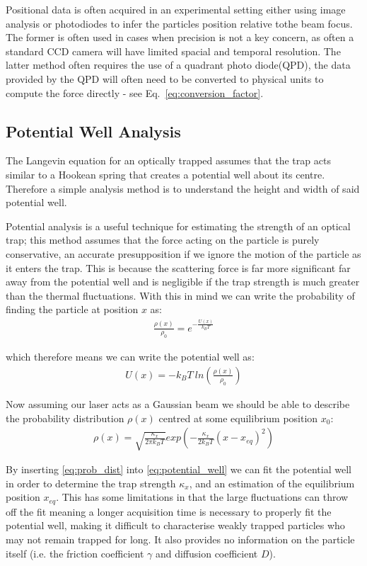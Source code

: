 Positional data is often acquired in an experimental setting 
either using image analysis or photodiodes to infer the particles 
position relative tothe beam focus. The former is often used in 
cases when precision is not a key concern, as often a standard 
CCD camera will have limited spacial and temporal resolution. 
The latter method often requires the use of a quadrant photo 
diode(QPD), the data provided by the QPD will often need to be 
converted to physical units to compute the force directly - see Eq.~\eqref{eq:conversion_factor}.

\subsection{Potential Well Analysis}
The Langevin equation for an optically trapped assumes that the 
trap acts similar to a Hookean spring that creates a potential 
well about its centre. Therefore a simple analysis method is to 
understand the height and width of said potential well. 

Potential analysis is a useful technique for estimating the 
strength of an optical trap; this method assumes that the force 
acting on the particle is purely conservative, an accurate 
presupposition if we ignore the motion of the particle as it 
enters the trap. This is because the scattering force is far 
more significant far away from the potential well and is 
negligible if the trap strength is much greater than the thermal 
fluctuations. With this in mind we can write the probability of 
finding the particle at position $x$ as:
\begin{align}
	\frac{\rho(x)}{\rho_0} = e^{-\frac{U(x)}{k_{B}T}} 
\end{align}

which therefore means we can write the potential well as:
\begin{align}
	\label{eq:potential_well}
	U(x)=-k_BT\ ln\left(\frac{\rho(x)}{\rho_0} \right)
\end{align}

Now assuming our laser acts as a Gaussian beam we should be able 
to describe the probability distribution $\rho(x)$ centred at 
some equilibrium position $x_0$:
\begin{align}
	\label{eq:prob_dist}
	\rho(x)= \sqrt{\frac{\kappa_x}{2\pi k_BT}} exp\left(-\frac{\kappa_x}{2k_BT}(x-x_{eq})^2\right)
\end{align}

By inserting \eqref{eq:prob_dist} into \eqref{eq:potential_well} 
we can fit the potential well in order to determine the trap strength 
$\kappa_x$, and an estimation of the equilibrium position $x_{eq}$. 
This has some limitations in that the large fluctuations can throw 
off the fit meaning a longer acquisition time is necessary to properly 
fit the potential well, making it difficult to characterise weakly 
trapped particles who may not remain trapped for long. It also 
provides no information on the particle itself (i.e. the friction 
coefficient $\gamma$ and diffusion coefficient $D$).

